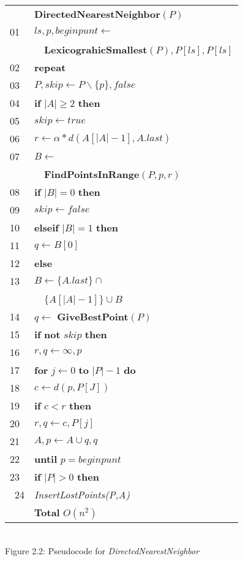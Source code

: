         \begin{center}
        \begin{tabular}{ll}
       & \textbf{DirectedNearestNeighbor}$(P)$\\
        01     & $ls,p,beginpunt \gets $\\
               & ~~\textbf{LexicograhicSmallest}$(P),P[ls],P[ls]$\\
        02     & \textbf \textbf{repeat}\\
        03     & \qquad $P,skip \gets P \backslash \{ p\},false$\\
        04     & \qquad \textbf{if} $|A| \geq 2$ \textbf{then}\\
        05     & \qquad \qquad $skip \gets true$\\
        06     & \qquad \qquad $r \gets \alpha * d(A[|A|-1],A.last)$\\
        07     & \qquad \qquad $B \gets$\\
               & \qquad \qquad ~~\textbf{FindPointsInRange}$(P,p,r)$\\
        08     & \qquad \qquad \textbf{if} $|B| = 0$ \textbf{then}\\
        09     & \qquad \qquad \qquad $skip \gets false$\\
        10     & \qquad \qquad \textbf{elseif} $|B| = 1$ \textbf{then}\\
        11     & \qquad \qquad \qquad $q \gets B[0]$\\
        12     & \qquad \qquad \textbf{else}\\
        13     & \qquad \qquad \qquad $B \gets \{A.last\} \cap$\\
               & \qquad \qquad \qquad ~~$\{A[|A|-1]\} \cup B$\\
        14     & \qquad \qquad \qquad $q \gets$ \textbf{GiveBestPoint}$(P)$\\
        15     & \qquad \textbf{if} \textbf{not} $skip$ \textbf{then}\\
        16     & \qquad \qquad $r,q \gets \infty,p$\\
        17     & \qquad \qquad \textbf{for} $j \gets 0$ \textbf{to} $|P| - 1$ \textbf{do}\\
        18     & \qquad \qquad \qquad $c \gets d(p,P[J])$\\
        19     & \qquad \qquad \qquad \textbf{if} $c < r$ \textbf{then}\\
        20     & \qquad \qquad \qquad \qquad  $r,q \gets c, P[j]$\\
        21     & \qquad $A,p \gets A \cup {q},q$\\
        22     &\textbf{until} $p = beginpunt$\\
        23     &  \textbf{if} $|P| > 0$ \textbf{then}\\\
        24     &  \qquad \emph{InsertLostPoints(P,A)}\\ \hline
       &  \qquad \qquad \qquad \qquad \textbf{Total } \qquad\qquad$O(n^{2})$
        \end{tabular}
        \label{fig:dnn_code}\\
        Figure 2.2: Pseudocode for \textit{DirectedNearestNeighbor}
      \end{center}

